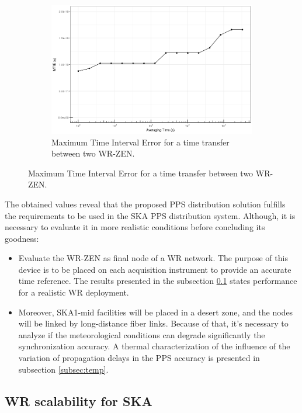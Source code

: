 \begin{figure}
	\begin{subfigure}[t]{0.48\textwidth}
		\includegraphics[width=\textwidth]{img/MTIE_exp1}
		\caption[MTIE plot for the WR-ZEN]{Maximum Time Interval Error for a 
		time transfer between two WR-ZEN.}
		\label{fig:mtie_exp1}
	\end{subfigure}
\end{figure}

The obtained values reveal that the proposed PPS distribution solution fulfills 
the requirements to be used in the SKA PPS distribution system. Although, it is 
necessary to evaluate it in more realistic conditions before concluding its goodness:

\begin{itemize}
	\item Evaluate the WR-ZEN as final node of a WR network. The purpose of 
	this device is to be placed on each acquisition instrument to provide an 
	accurate time reference. The results presented in the subsection 
	\ref{subsec: net_exp} states performance for a realistic WR deployment.
	
	\item Moreover, SKA1-mid facilities will be placed in a desert zone, and 
	the nodes will be linked by long-distance fiber links. Because of that, 
	it's 
	necessary to analyze if the meteorological conditions can degrade 
	significantly the synchronization accuracy. A thermal characterization of 
	the influence of the variation of propagation delays in the PPS accuracy is 
	presented in subsection \ref{subsec:temp}.
\end{itemize}   

\subsection{WR scalability for SKA} %
\label{subsec: net_exp}

